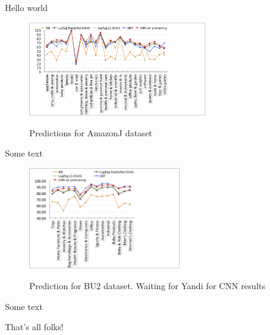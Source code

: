 Hello world



\begin{figure}
\centering
\includegraphics[width=0.68\textwidth]{images/amazonj-WUC-predictions}
\label{Figure_amazonj-WUC-predictions}
\caption{Predictions for AmazonJ dataset}
\end{figure}
Some text

\begin{figure}
\centering
\includegraphics[width=0.58\textwidth]{images/BU2-WUC-predictions}
\label{Figure_BU2-WUC-predictions}
\caption{Prediction for BU2 dataset. Waiting for Yandi for CNN results}
\end{figure}
Some text

That's all folks!
